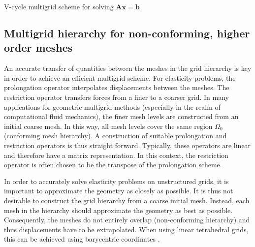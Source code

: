 \begin{algorithm}  
\caption{V-cycle multigrid scheme for solving $\mathbf A \mathbf x = \mathbf b$}
\label{MGAlgo}
  \begin{algorithmic}
	\Else
	\EndIf	
	\State \Return{ \mbx }
	\EndProcedure	
  \end{algorithmic}
\end{algorithm}

\subsection{Multigrid hierarchy for non-conforming, higher order meshes}
\label{MultigridHierarchySection}

An accurate transfer of quantities between the meshes in the grid hierarchy is key in order to achieve an efficient multigrid scheme. For elasticity problems, the prolongation operator interpolates displacements between the meshes. The restriction operator transfers forces from a finer to a coarser grid. In many applications for geometric multigrid methods (especially in the realm of computational fluid mechanics), the finer mesh levels are constructed from an initial coarse mesh. In this way, all mesh levels cover the same region $\Omega_0$ (conforming mesh hierarchy). A construction of suitable prolongation and restriction operators is thus straight forward. Typically, these operators are linear and therefore have a matrix representation. In this context, the restriction operator is often chosen to be the transpose of the prolongation scheme. 

In order to accurately solve elasticity problems on unstructured grids, it is important to approximate the geometry as closely as possible. It is thus not desirable to construct the grid hierarchy from a coarse initial mesh. Instead, each mesh in the hierarchy should approximate the geometry as best as possible. Consequently, the meshes do not entirely overlap (non-conforming hierarchy) and thus displacements have to be extrapolated. When using linear tetrahedral grids, this can be achieved using barycentric coordinates \cite{Georgii2008}.

